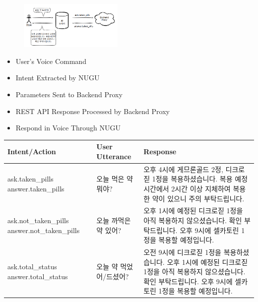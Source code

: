 \documentclass[conference]{IEEEtran}
\begin{document}
\begin{figure}[h!]
\centering
\includegraphics[width=5cm]{final_image_folder/nugu_arch.png}
\caption{}
\label{fig:map}
\end{figure}

\begin{itemize}%
  \renewcommand{\labelitemi}{$\rightarrow$}
 \item User’s Voice Command \\
 
 \item Intent Extracted by NUGU\\
 
 \item Parameters Sent to Backend Proxy\\
 
 \item REST API Response Processed by Backend Proxy\\
 
 \item Respond in Voice Through NUGU\\
\end{itemize}

\begin{table}[h!]
\begin{tabular}{|p{}|p{}|p{}|}
\cline{1-3} 
\textbf{Intent/Action} &\textbf{User Utterance} & \textbf{Response}\\
\hline
ask.taken\_pills \newline answer.taken\_pills&오늘 먹은 약 뭐야?&오후 4시에 게므론골드 2정, 디크로짇 1정을 복용하셨습니다. 복용 예정 시간에서 2시간 이상 지체하여 복용한 약이 있으니 주의 부탁드립니다. \\
\hline
ask.not\_taken\_pills \newline answer.not\_taken\_pills&오늘 까먹은 약 있어?&오후 1시에 예정된 디크로짇 1정을 아직 복용하지 않으셨습니다. 확인 부탁드립니다. 오후 9시에 셀카토린 1정을 복용할 예정입니다.\\
\hline
ask.total\_status \newline answer.total\_status&오늘 약 먹었어/드셨어?&오전 9시에 디크로짇 1정을 복용하셨습니다. 오후 1시에 예정된 디크로짇 1정을 아직 복용하지 않으셨습니다. 확인 부탁드립니다. 오후 9시에 셀카토린 1정을 복용할 예정입니다.\\
\hline
\end{tabular}
\label{tab1e}
\end{table}
\end{document}
